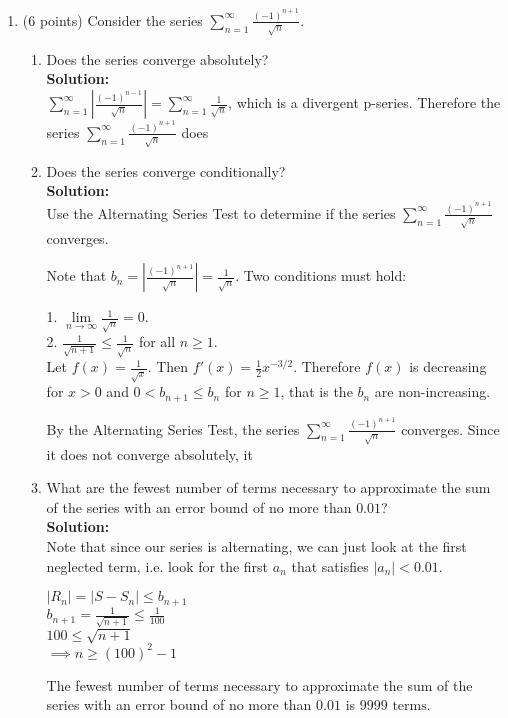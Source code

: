 \documentclass[paper=a4, fontsize=11pt]{scrartcl} %
\numberwithin{equation}{section} %
\numberwithin{figure}{section} %
\numberwithin{table}{section} %
\begin{document}
\begin{enumerate}
\newpage

\item (6 points) Consider the series $\sum\limits_{n=1}^\infty \frac{(-1)^{n+1}}{\sqrt{n}}$.
\begin{enumerate}
\item Does the series converge absolutely?\\
\noindent\textbf{Solution:}\\
 $\sum\limits_{n=1}^\infty |\frac{(-1)^{n-1}}{\sqrt{n}}|=\sum\limits_{n=1}^\infty \frac{1}{\sqrt{n}}$, which is a divergent p-series.  Therefore the series $\sum\limits_{n=1}^\infty \frac{(-1)^{n+1}}{\sqrt{n}}$ does 
 \vspace{.5in}
\item Does the series converge conditionally?\\
\noindent\textbf{Solution:}\\
Use the Alternating Series Test to determine if the series $\sum\limits_{n=1}^\infty \frac{(-1)^{n+1}}{\sqrt{n}}$ converges. 

Note that $b_n=|\frac{(-1)^{n+1}}{\sqrt{n}}|=\frac{1}{\sqrt{n}}.$  Two conditions must hold:

1. $\lim\limits_{n \rightarrow \infty} \frac{1}{\sqrt{n}}=0.$\\

2. $\frac{1}{\sqrt{n+1}} \le \frac{1}{\sqrt{n}}$ for all $n\ge 1$.\\
Let $f(x)=\frac{1}{\sqrt{x}}$.  Then $f'(x)=\frac{1}{2}x^{-3/2}$.  Therefore $f(x)$ is decreasing for $x > 0$ and $0<b_{n+1}\le b_n$ for $n \ge 1$, that is the $b_n$ are non-increasing.

By the Alternating Series Test, the series  $\sum\limits_{n=1}^\infty \frac{(-1)^{n+1}}{\sqrt{n}}$ converges.  Since it does not converge absolutely, it 

 \vspace{.5in}
\item What are the fewest number of terms necessary to approximate the sum of the series with an error bound of no more than $0.01$?\\
\noindent\textbf{Solution:}\\
Note that since our series is alternating, we can just look at the first neglected term, i.e. look for the first $a_n$ that satisfies $|a_n|<0.01$.

$|R_n|=|S-S_n|\le b_{n+1}$\\
$b_{n+1}=\frac{1}{\sqrt{n+1}}\le \frac{1}{100}$\\
$100\le \sqrt{n+1}$\\
$\implies n \ge (100)^2-1$

The fewest number of terms necessary to approximate the sum of the series with an error bound of no more than $0.01$ is $\boxed{9999 \text{ terms.}}$

\end{enumerate}

\end{enumerate}

\end{document}
